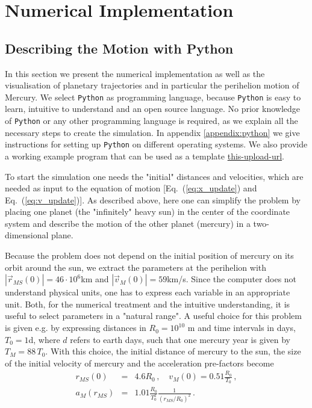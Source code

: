 \documentclass[12pt,ngerman,american]{iopart}
\newcommand{\python}[0]{\texttt{Python}}
\newcommand{\abs}[1]{\left\vert #1 \right\vert}
\begin{document}
\section{Numerical Implementation}\label{sec:Numerical Implementation}

\subsection{Describing the Motion with Python}

In this section we present the numerical implementation as well as the visualisation of planetary trajectories and in
particular
the perihelion motion of Mercury.  We select \python{} \cite{Python} as  programming language, because \python{} is easy to learn, intuitive to understand and an open source language.
No prior knowledge of \python{} or any other programming language is required, as we explain all the necessary steps to create the simulation.
In appendix \ref{appendix:python} we give instructions for setting up \python{} on different operating systems.
We also provide a working example program that can be used as a template \url{this-upload-url}.

To start the simulation one needs the "initial" distances and velocities, which are needed as input to the equation of motion [Eq.~(\ref{eq:x_update}) and Eq.~(\ref{eq:v_update})].
As described above, here  one can simplify the problem by placing one planet (the "infinitely" heavy sun) in the center of the coordinate system and describe the motion of the other planet (mercury) in a two-dimensional plane.  

Because the problem does not depend on the initial position of mercury on its orbit around the sun, we extract the parameters at the perihelion with $ \abs{\vec r_{MS}(0)} = 46 \cdot 10^6$km and $ \abs{\vec v_M(0)} = 59$km/s\cite{MercuryFactSheet}.
Since the computer does not understand physical units, one has to express each variable in an appropriate unit.
Both, for the numerical treatment and the intuitive understanding, it is useful to select parameters in a "natural range".
A useful choice for this problem is given e.g. by expressing distances in $R_0 = 10^{10}$ m and time intervals in days, $T_0 = 1$d, where $d$ refers to earth days, such that one mercury year is given by $T_M=88\,T_0$.
With this choice, the initial distance of mercury to the sun, the size of the initial velocity of mercury and the acceleration pre-factors become
\begin{eqnarray}
r_{MS}(0)   &=& 4.6 R_0 \, , \quad
v_{M}(0)    = 0.51 \frac{R_0}{T_0} \, ,  \\
a_M(r_{MS}) &=& 1.01 \frac{R_0}{T_0^2} \frac{1}{\left(r_{MS}/R_0\right)^2} 
\, .
\end{eqnarray}
\end{document}
